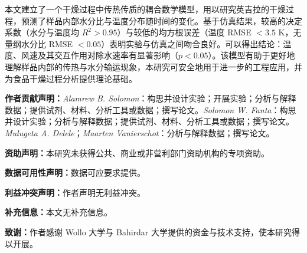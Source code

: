 \documentclass[11pt,a4paper]{ctexart}
\begin{document}
本文建立了一个干燥过程中传热传质的耦合数学模型，用以研究英吉拉的干燥过程，预测了样品内部水分比与温度分布随时间的变化。基于仿真结果，较高的决定系数（水分与温度均 $R^2>0.95$）与较低的均方根误差（温度 RMSE $<3.5$ K，无量纲水分比 RMSE $<0.05$）表明实验与仿真之间吻合良好。可以得出结论：温度、风速及其交互作用对除水速率有显著影响（$p<0.05$）。该模型有助于更好地理解样品内部的传热与水分输运现象，本研究可安全地用于进一步的工程应用，并为食品干燥过程分析提供理论基础。

\vspace{8pt}
\noindent\textbf{作者贡献声明：}\textit{Alamrew B. Solomon}：构思并设计实验；开展实验；分析与解释数据；提供试剂、材料、分析工具或数据；撰写论文。\textit{Solomon W. Fanta}：构思并设计实验；分析与解释数据；提供试剂、材料、分析工具或数据；撰写论文。\textit{Mulugeta A. Delele}；\textit{Maarten Vanierschot}：分析与解释数据；撰写论文。

\noindent\textbf{资助声明：}本研究未获得公共、商业或非营利部门资助机构的专项资助。

\noindent\textbf{数据可用性声明：}数据可应要求提供。

\noindent\textbf{利益冲突声明：}作者声明无利益冲突。

\noindent\textbf{补充信息：}本文无补充信息。

\noindent\textbf{致谢：}作者感谢 Wollo 大学与 Bahirdar 大学提供的资金与技术支持，使本研究得以开展。
\end{document}
